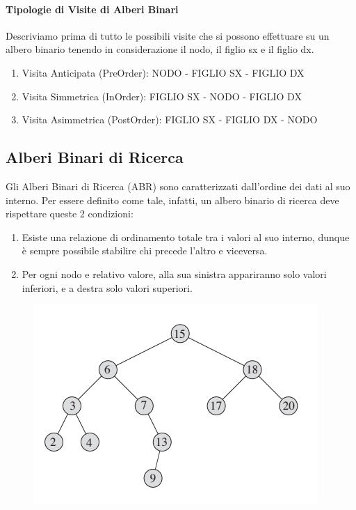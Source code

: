 \documentclass{article}
\begin{document}
\newpage

\paragraph{Tipologie di Visite di Alberi Binari} Descriviamo prima di tutto le possibili visite che si possono effettuare su un albero binario tenendo in considerazione il nodo, il figlio sx e il figlio dx.

\begin{enumerate}
    \item Visita Anticipata (PreOrder): NODO - FIGLIO SX - FIGLIO DX
    \item Visita Simmetrica (InOrder): FIGLIO SX - NODO - FIGLIO DX
    \item Visita Asimmetrica (PostOrder): FIGLIO SX - FIGLIO DX - NODO
\end{enumerate}

\subsection{Alberi Binari di Ricerca}

Gli Alberi Binari di Ricerca (ABR) sono caratterizzati dall'ordine dei dati al suo interno. Per essere definito come tale, infatti, un albero binario di ricerca deve rispettare queste 2 condizioni:

\begin{enumerate}
    \item Esiste una relazione di ordinamento totale tra i valori al suo interno, dunque è sempre possibile stabilire chi precede l'altro e viceversa.
    \item Per ogni nodo e relativo valore, alla sua sinistra appariranno solo valori inferiori, e a destra solo valori superiori.
\end{enumerate}

\begin{figure}[htbp]
        \center
        \includegraphics[scale=0.75]{img/ABR.png}
    \end{figure}
\end{document}
